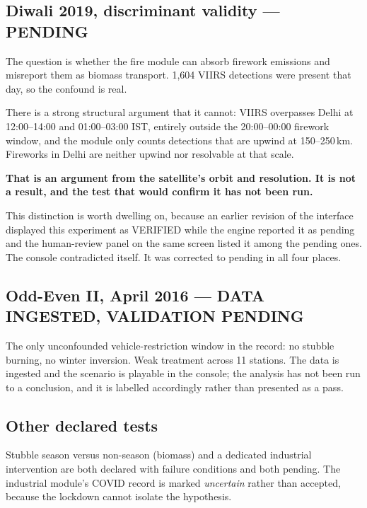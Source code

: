 \documentclass[11pt,a4paper]{article}
\newcommand{\keyclaim}[1]{%
  \par\vspace{0.7ex}\noindent
  \colorbox{vwash}{\parbox{\dimexpr\linewidth-2\fboxsep}{%
    \color{vblack}\textbf{#1}}}%
  \par\vspace{0.9ex}}
\begin{document}
\subsection{Diwali 2019, discriminant validity --- PENDING}

The question is whether the fire module can absorb firework emissions and misreport
them as biomass transport. 1{,}604 VIIRS detections were present that day, so the
confound is real.

There is a strong structural argument that it cannot: VIIRS overpasses Delhi at
12:00--14:00 and 01:00--03:00 IST, entirely outside the 20:00--00:00 firework
window, and the module only counts detections that are upwind at 150--250\,km.
Fireworks in Delhi are neither upwind nor resolvable at that scale.

\keyclaim{That is an argument from the satellite's orbit and resolution. It is not a
result, and the test that would confirm it has not been run.}

This distinction is worth dwelling on, because an earlier revision of the interface
displayed this experiment as VERIFIED while the engine reported it as pending and
the human-review panel on the same screen listed it among the pending ones. The
console contradicted itself. It was corrected to pending in all four places.

\subsection{Odd-Even II, April 2016 --- DATA INGESTED, VALIDATION PENDING}

The only unconfounded vehicle-restriction window in the record: no stubble burning,
no winter inversion. Weak treatment across 11 stations. The data is ingested and the
scenario is playable in the console; the analysis has not been run to a conclusion,
and it is labelled accordingly rather than presented as a pass.

\subsection{Other declared tests}

Stubble season versus non-season (biomass) and a dedicated industrial intervention
are both declared with failure conditions and both pending. The industrial module's
COVID record is marked \emph{uncertain} rather than accepted, because the lockdown
cannot isolate the hypothesis.

\end{document}
